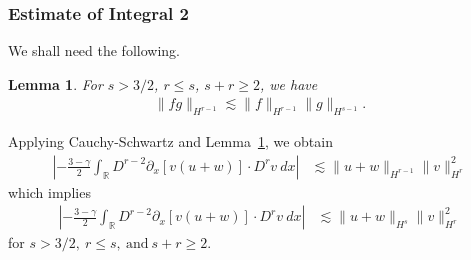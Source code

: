 \documentclass[12pt,reqno]{amsart}
\numberwithin{equation}{section}  %
\numberwithin{figure}{section}
\newcommand{\rr}{\mathbb{R}}
\newcommand{\p}{\partial}
\newtheorem{lemma}[theorem]{Lemma}
\begin{document}
\subsubsection{Estimate of Integral 2} We shall need the following.
%
%
%
%
%
%
%
%
\begin{lemma}
For $s > 3/2$, $r \le s$, $s + r \ge 2$, we have
%
%
\begin{equation*}
\begin{split}
  \| fg \|_{H^{r-1}} \lesssim \| f \|_{H^{r-1}} \| g \|_{H^{s-1}}.
\end{split}
\end{equation*}
%
%
\label{lem:frac-deriv}
\end{lemma}
%
%
%
%
%
%
Applying Cauchy-Schwartz and Lemma~\ref{lem:frac-deriv}, we obtain
%
%
%
\begin{equation*}
\begin{split}
\left | - \frac{3-\gamma}{2} \int_{\rr}  D^{r -2}
\p_x[v(u+w)] \cdot
D^r v \ dx  \right |
 & \lesssim \|u+w\|_{H^{r -1}} \|v\|_{H^r}^2
\end{split}
\end{equation*}
%
%
which implies
\begin{equation}
\begin{split}
\left | - \frac{3-\gamma}{2} \int_{\rr}  D^{r -2}
\p_x[v(u+w)] \cdot
D^r v \ dx  \right |
 & \lesssim \|u+w\|_{H^{s}} \|v\|_{H^r}^2
 \label{3v}
\end{split}
\end{equation}
%
for $s > 3/2, \ r \le s, \ \text{and} \ s + r \ge 2$.
%
%
\end{document}
